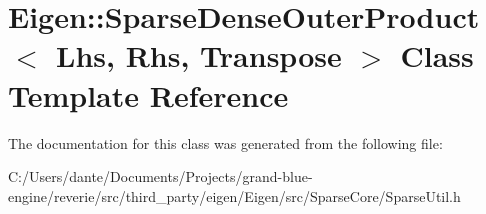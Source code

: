 \hypertarget{class_eigen_1_1_sparse_dense_outer_product}{}\section{Eigen\+::Sparse\+Dense\+Outer\+Product$<$ Lhs, Rhs, Transpose $>$ Class Template Reference}
\label{class_eigen_1_1_sparse_dense_outer_product}


The documentation for this class was generated from the following file\+:\begin{DoxyCompactItemize}
\item 
C\+:/\+Users/dante/\+Documents/\+Projects/grand-\/blue-\/engine/reverie/src/third\+\_\+party/eigen/\+Eigen/src/\+Sparse\+Core/Sparse\+Util.\+h\end{DoxyCompactItemize}
